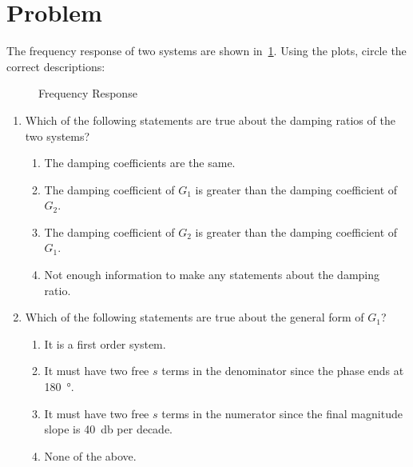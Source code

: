 \documentclass[titlepage, 11pt, reqno]{article}    %
\begin{document}
\begin{figure*}[htbp]
\centering
\begin{scaletikzpicturetowidth}{0.95\textwidth}
\end{scaletikzpicturetowidth}
\end{figure*}

\newpage
\thispagestyle{plain}
\mbox{}

\newpage
\section{Problem}\label{prob:bode_response_analysis}
The frequency response of two systems are shown in~\cref{fig:prob1_bode}.
Using the plots, circle the correct descriptions:
\begin{figure}[htbp]
    \centering
    
    \caption{Frequency Response~\label{fig:prob1_bode}}
\end{figure}  

\begin{enumerate}
    \item Which of the following statements are true about the damping ratios of the two systems?
    \begin{enumerate}
        \item The damping coefficients are the same.
        \item The damping coefficient of \(G_1\) is greater than the damping coefficient of \(G_2\).
        \item The damping coefficient of \(G_2\) is greater than the damping coefficient of \(G_1\).
        \item Not enough information to make any statements about the damping ratio.
    \end{enumerate} 
    \item Which of the following statements are true about the general form of \(G_1\)?
    \begin{enumerate}
        \item It is a first order system.
        \item It must have two free \(s\) terms in the denominator since the phase ends at \SI{180}{\degree}.
        \item It must have two free \(s\) terms in the numerator since the final magnitude slope is \SI{40}{\decibel} per decade.
        \item None of the above.
    \end{enumerate}
\end{enumerate}
\clearpage
\end{document}
